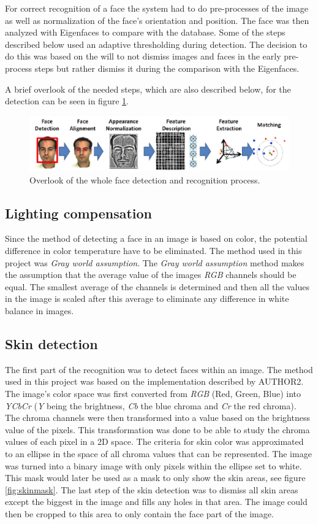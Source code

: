 For correct recognition of a face the system had to do pre-processes of the
image as well as normalization of the face’s orientation and position. The
face was then analyzed with Eigenfaces to compare with the database. Some of
the steps described below used an adaptive thresholding during detection. The
decision to do this was based on the will to not dismiss images and faces in
the early pre-process steps but rather dismiss it during the comparison with
the Eigenfaces.

A brief overlook of the needed steps, which are also described below, for the detection can be seen in figure \ref{fig:overlook}.

\begin{figure}[htbp]
  \centering
  \includegraphics[width=\columnwidth]{images/process.jpg}
  \caption{Overlook of the whole face detection and recognition process.}
  \label{fig:overlook}
\end{figure}

\subsection{Lighting compensation}
Since the method of detecting a face in an image is based on color, the
potential difference in color temperature have to be eliminated. The method
used in this project was \emph{Gray world assumption}. The \emph{Gray world
assumption} method makes the assumption that the average value of the images
\emph{RGB} channels should be equal. The smallest average of the channels is
determined and then all the values in the image is scaled after this average
to eliminate any difference in white balance in images.

\subsection{Skin detection}
The first part of the recognition was to detect faces within an image. The
method used in this project was based on the implementation described by
AUTHOR2. The image’s color space was first converted from \emph{RGB} (Red,
Green, Blue) into \emph{YCbCr} (\emph{Y} being the brightness, \emph{Cb} the
blue chroma and \emph{Cr} the red chroma). The chroma channels were then
transformed into a value based on the brightness value of the pixels. This
transformation was done to be able to study the chroma values of each pixel in
a 2D space. The criteria for skin color was approximated to an ellipse in the
space of all chroma values that can be represented. The image was turned into
a binary image with only pixels within the ellipse set to white. This mask
would later be used as a mask to only show the skin areas, see figure \ref{fig:skinmask}. The last step of the skin detection was to dismiss all skin areas
except the biggest in the image and fills any holes in that area. The image
could then be cropped to this area to only contain the face part of the image.

